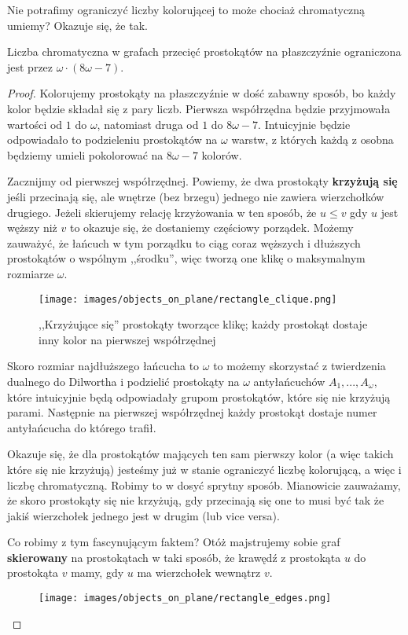 Nie potrafimy ograniczyć liczby kolorującej to może chociaż chromatyczną umiemy? Okazuje się, że tak.
\begin{theorem}
	Liczba chromatyczna w grafach przecięć prostokątów na płaszczyźnie ograniczona jest przez \(\omega \cdot (8\omega - 7)\).
\end{theorem}
\begin{proof}
	Kolorujemy prostokąty na płaszczyźnie w dość zabawny sposób, bo każdy kolor będzie składał się z pary liczb.
	Pierwsza współrzędna będzie przyjmowała wartości od \(1\) do \(\omega\), natomiast druga od \(1\) do \(8\omega - 7\).
	Intuicyjnie będzie odpowiadało to podzieleniu prostokątów na \(\omega\) warstw, z których każdą z osobna będziemy umieli pokolorować na \(8\omega - 7\) kolorów.

	Zacznijmy od pierwszej współrzędnej.
	Powiemy, że dwa prostokąty \textbf{krzyżują się} jeśli przecinają się, ale wnętrze (bez brzegu) jednego nie zawiera wierzchołków drugiego.
	Jeżeli skierujemy relację krzyżowania w ten sposób, że
	\(u \leq v\) gdy \(u\) jest węższy niż \(v\) to okazuje się, że dostaniemy częściowy porządek.
	Możemy zauważyć, że łańcuch w tym porządku to ciąg coraz węższych i dłuższych prostokątów o wspólnym ,,środku'', więc tworzą one klikę o maksymalnym rozmiarze \(\omega\).

	\begin{figure}[H]
		\centering
		\texttt{[image: images/objects\_on\_plane/rectangle\_clique.png]}
		\caption{,,Krzyżujące się'' prostokąty tworzące klikę; każdy prostokąt dostaje inny kolor na pierwszej współrzędnej}
	\end{figure}


	Skoro rozmiar najdłuższego łańcucha to \(\omega\) to możemy skorzystać z twierdzenia dualnego do Dilwortha i podzielić prostokąty na \(\omega\) antyłańcuchów \(A_1, ..., A_\omega\),
	które intuicyjnie będą odpowiadały grupom prostokątów, które się nie krzyżują parami.
	Następnie na pierwszej współrzędnej każdy prostokąt dostaje numer antyłańcucha do którego trafił.

	Okazuje się, że dla prostokątów mających ten sam pierwszy kolor (a więc takich które się nie krzyżują) jesteśmy już w stanie ograniczyć liczbę kolorującą, a więc i liczbę chromatyczną. Robimy to w dosyć sprytny sposób.  Mianowicie zauważamy, że skoro prostokąty się nie krzyżują, gdy przecinają się one to musi być tak że jakiś wierzchołek jednego jest w drugim (lub vice versa).

	Co robimy z tym fascynującym faktem? Otóż majstrujemy sobie graf \textbf{skierowany} na prostokątach w taki sposób,
	że krawędź z prostokąta \(u\) do prostokąta \(v\) mamy, gdy \(u\) ma wierzchołek wewnątrz \(v\).
	\begin{figure}[H]
		\centering
		\texttt{[image: images/objects\_on\_plane/rectangle\_edges.png]}


\end{figure}
\end{proof}

